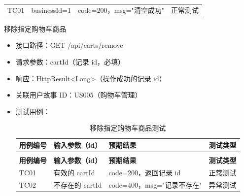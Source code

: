 \begin{levellist}
\begin{levellist}
\begin{itemize}
\begin{longtable}{>{\centering\arraybackslash}m{1.7cm} >{\centering\arraybackslash}m{3cm} >{\centering\arraybackslash}m{6.3cm} >{\centering\arraybackslash}m{2cm}}
                      \bottomrule
                      \endfoot


                      TC01          & businessId=1      & code=200，msg="清空成功" & 正常测试          \\
                  \end{longtable}
        \end{itemize}

        \item 移除指定购物车商品
        \begin{itemize}
            \item 接口路径：GET /api/carts/remove
            \item 请求参数：cartId（记录 id，必填）
            \item 响应：HttpResult<Long>（操作成功的记录 id）
            \item 关联用户故事 ID：US005（购物车管理）
            \item 测试用例：
                  \begin{longtable}{>{\centering\arraybackslash}m{1.7cm} >{\centering\arraybackslash}m{3cm} >{\centering\arraybackslash}m{6.3cm} >{\centering\arraybackslash}m{2cm}}

                      \caption{移除指定购物车商品测试} \label{tab:training}                               \\

                      \toprule
                      \textbf{用例编号} & \textbf{输入参数（id）} & \textbf{预期结果}        & \textbf{测试类型} \\
                      \midrule
                      \endfirsthead

                      \multicolumn{4}{c}{{\tablename\ \thetable{} 续表}}                         \\
                      \toprule
                      \textbf{用例编号} & \textbf{输入参数（id）} & \textbf{预期结果}        & \textbf{测试类型} \\
                      \midrule
                      \endhead

                      \bottomrule
                      \endfoot

                      TC01          & 有效的 cartId        & code=200，返回记录 id     & 正常测试          \\
                      TC02          & 不存在的 cartId       & code=400，msg="记录不存在" & 异常测试          \\
                  \end{longtable}
        \end{itemize}
    \end{levellist}


\end{levellist}
